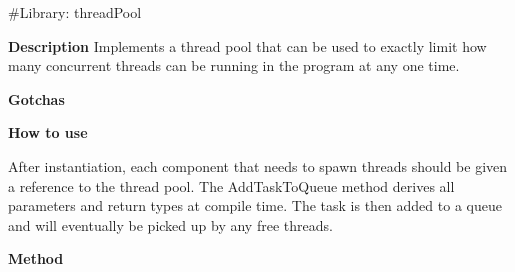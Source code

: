 \#\+Library\+: thread\+Pool

{\bfseries{Description}} Implements a thread pool that can be used to exactly limit how many concurrent threads can be running in the program at any one time.

{\bfseries{Gotchas}}

{\bfseries{How to use}}

After instantiation, each component that needs to spawn threads should be given a reference to the thread pool. The Add\+Task\+To\+Queue method derives all parameters and return types at compile time. The task is then added to a queue and will eventually be picked up by any free threads.

{\bfseries{Method}} 
